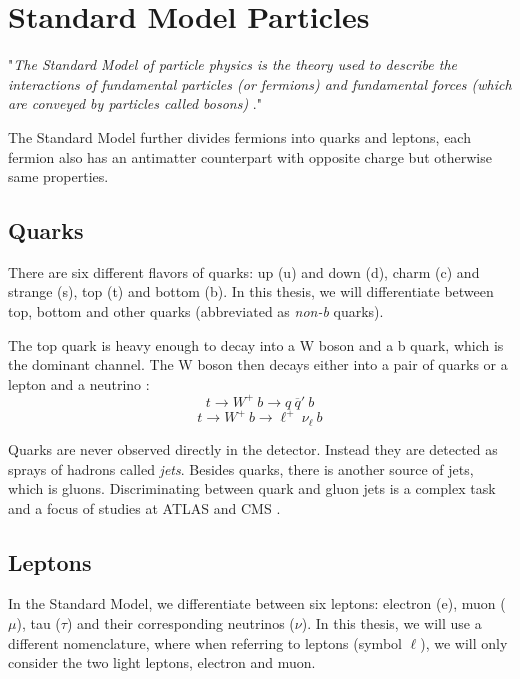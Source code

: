 \documentclass{ctuthesis}
\begin{document}
\section{Standard Model Particles}
"\emph{The Standard Model of particle physics is the theory used to describe the interactions of fundamental particles (or fermions) and fundamental forces (which are conveyed by particles called bosons)} \cite{standard_model}."

The Standard Model further divides fermions into quarks and leptons, each fermion also has an antimatter counterpart with opposite charge but otherwise same properties.


\begin{figure}[h]
\end{figure}

\subsection{Quarks}
\label{top_decay}
There are six different flavors of quarks: up (u) and down (d), charm (c) and strange (s), top (t) and bottom (b). In this thesis, we will differentiate between top, bottom and other quarks (abbreviated as \emph{non-b} quarks).

The top quark is heavy enough to decay into a W boson and a b quark, which is the dominant channel. The W boson then decays either into a pair of quarks or a lepton and a neutrino \cite[p. 638]{pdg_review}:
$$t \rightarrow W^{+} \: b \rightarrow q \: \overline{q}' \: b$$
$$t \rightarrow W^{+} \: b \rightarrow \ell^{+} \: \nu_{\ell} \: b$$

Quarks are never observed directly in the detector. Instead they are detected as sprays of hadrons called \emph{jets}. Besides quarks, there is another source of jets, which is gluons. Discriminating between quark and gluon jets is a complex task and a focus of studies at ATLAS and CMS \cite{jets_1}\cite{jets_2}.

\subsection{Leptons}
In the Standard Model, we differentiate between six leptons: electron (e), muon ($\mu$), tau ($\tau$) and their corresponding neutrinos ($\nu$). In this thesis, we will use a different nomenclature, where when referring to leptons (symbol $\ell$), we will only consider the two light leptons, electron and muon.
\end{document}

